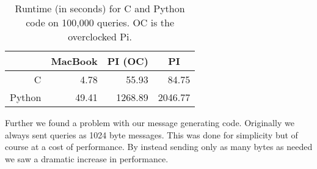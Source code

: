\begin{table}[h]
    \begin{center}
    \begin{tabular}{|r|r|r|r|}
    \hline
       & \multicolumn{1}{|c|}{MacBook} & \multicolumn{1}{|c|}{PI (OC)}  & \multicolumn{1}{|c|}{PI} \\
    \hline
    C      & 4.78 & 55.93 & 84.75     \\
    \hline
    Python & 49.41 & 1268.89 & 2046.77   \\

    \hline
    \end{tabular}
    \caption{Runtime (in seconds) for C and Python code on 100,000 queries. OC is the overclocked Pi.}
    \label{tbl:runtimes_ports}
    \end{center}
\end{table}

Further we found a problem with our message generating code. Originally we always sent queries as 1024 byte messages. This was done for simplicity but of course at a cost of performance. By instead sending only as many bytes as needed we saw a dramatic increase in performance.











